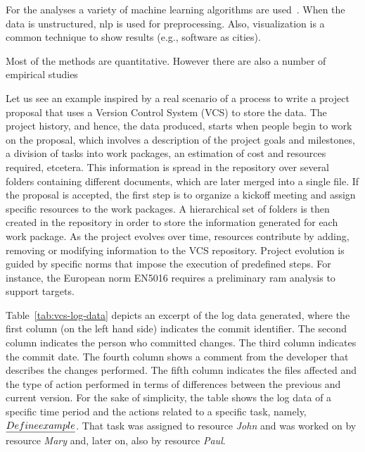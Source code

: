 For the analyses a variety of machine learning algorithms are used~\citep{bibid}. When the data is unstructured, \gls{nlp} is used for preprocessing. Also, visualization is a common technique to show results \citep{Lanzaetal} (e.g., software as cities).

Most of the methods are quantitative. However there are also a number of empirical studies \citep{DBLP:journals/ese/KalliamvakouGBS16,dehghan2017predicting} 


Let us see an example inspired by a real scenario of a process to write a project proposal that uses a Version Control System (VCS) to store the data. The project history, and hence, the data produced, starts when people begin to work on the proposal, which involves a description of the project goals and milestones, a division of tasks into work packages, an estimation of cost and resources required, etcetera. This information is spread in the repository over several folders containing different documents, which are later merged into a single file. If the proposal is accepted, the first step is to organize a kickoff meeting and assign specific resources to the work packages. A hierarchical set of folders is then created in the repository in order to store the information generated for each work package. As the project evolves over time, resources contribute by adding, removing or modifying information to the VCS repository. %
Project evolution is guided by specific norms that impose the execution of predefined steps. For instance, the European norm EN5016 requires a preliminary \gls{ram} analysis to support targets. 

Table~\ref{tab:vcs-log-data} depicts an excerpt of the log data generated, where the first column (on the left hand side) indicates the commit identifier. The second column indicates the person who committed changes. The third column indicates the commit date. The fourth column shows a comment from the developer that describes the changes performed.
The fifth column indicates the files affected and the type of action performed in terms of differences between the previous and current version. 
For the sake of simplicity, the table shows the log data of a specific time period and the actions related to a specific task, namely, $\emph{Define example}$. That task was assigned to resource \emph{John} %
and was worked on by resource \emph{Mary} and, later on, also by resource \emph{Paul}.

